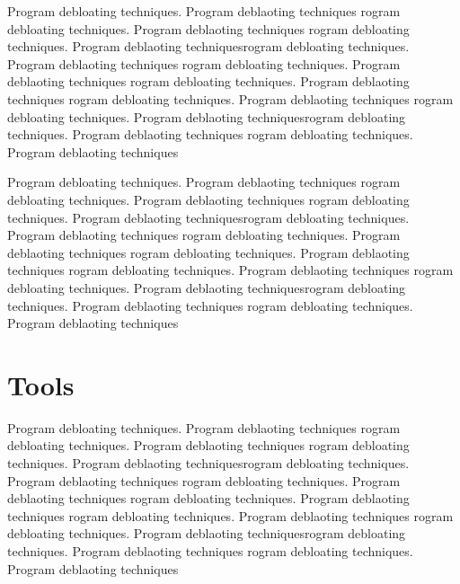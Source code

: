 \documentclass{relatorio}
\begin{document}
Program debloating techniques. Program deblaoting techniques rogram debloating techniques. Program deblaoting techniques
rogram debloating techniques. Program deblaoting techniquesrogram debloating techniques. Program deblaoting techniques
rogram debloating techniques. Program deblaoting techniques rogram debloating techniques. Program deblaoting techniques
rogram debloating techniques. Program deblaoting techniques 
rogram debloating techniques. Program deblaoting techniquesrogram debloating techniques. Program deblaoting techniques
rogram debloating techniques. Program deblaoting techniques

Program debloating techniques. Program deblaoting techniques rogram debloating techniques. Program deblaoting techniques
rogram debloating techniques. Program deblaoting techniquesrogram debloating techniques. Program deblaoting techniques
rogram debloating techniques. Program deblaoting techniques rogram debloating techniques. Program deblaoting techniques
rogram debloating techniques. Program deblaoting techniques 
rogram debloating techniques. Program deblaoting techniquesrogram debloating techniques. Program deblaoting techniques
rogram debloating techniques. Program deblaoting techniques

\section{Tools}%
\label{Tools}

Program debloating techniques. Program deblaoting techniques rogram debloating techniques. Program deblaoting techniques
rogram debloating techniques. Program deblaoting techniquesrogram debloating techniques. Program deblaoting techniques
rogram debloating techniques. Program deblaoting techniques rogram debloating techniques. Program deblaoting techniques
rogram debloating techniques. Program deblaoting techniques 
rogram debloating techniques. Program deblaoting techniquesrogram debloating techniques. Program deblaoting techniques
rogram debloating techniques. Program deblaoting techniques
\end{document}

